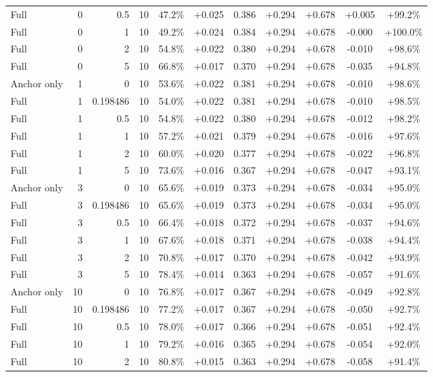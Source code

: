 \begin{table}[htbp]
\begin{tabular}{lrrrccccccc}
Full & 0 & 0.5 & 10 & 47.2\% & +0.025 & 0.386 & +0.294 & +0.678 & +0.005 & +99.2\% \\
Full & 0 & 1 & 10 & 49.2\% & +0.024 & 0.384 & +0.294 & +0.678 & -0.000 & +100.0\% \\
Full & 0 & 2 & 10 & 54.8\% & +0.022 & 0.380 & +0.294 & +0.678 & -0.010 & +98.6\% \\
Full & 0 & 5 & 10 & 66.8\% & +0.017 & 0.370 & +0.294 & +0.678 & -0.035 & +94.8\% \\
Anchor only & 1 & 0 & 10 & 53.6\% & +0.022 & 0.381 & +0.294 & +0.678 & -0.010 & +98.6\% \\
Full & 1 & 0.198486 & 10 & 54.0\% & +0.022 & 0.381 & +0.294 & +0.678 & -0.010 & +98.5\% \\
Full & 1 & 0.5 & 10 & 54.8\% & +0.022 & 0.380 & +0.294 & +0.678 & -0.012 & +98.2\% \\
Full & 1 & 1 & 10 & 57.2\% & +0.021 & 0.379 & +0.294 & +0.678 & -0.016 & +97.6\% \\
Full & 1 & 2 & 10 & 60.0\% & +0.020 & 0.377 & +0.294 & +0.678 & -0.022 & +96.8\% \\
Full & 1 & 5 & 10 & 73.6\% & +0.016 & 0.367 & +0.294 & +0.678 & -0.047 & +93.1\% \\
Anchor only & 3 & 0 & 10 & 65.6\% & +0.019 & 0.373 & +0.294 & +0.678 & -0.034 & +95.0\% \\
Full & 3 & 0.198486 & 10 & 65.6\% & +0.019 & 0.373 & +0.294 & +0.678 & -0.034 & +95.0\% \\
Full & 3 & 0.5 & 10 & 66.4\% & +0.018 & 0.372 & +0.294 & +0.678 & -0.037 & +94.6\% \\
Full & 3 & 1 & 10 & 67.6\% & +0.018 & 0.371 & +0.294 & +0.678 & -0.038 & +94.4\% \\
Full & 3 & 2 & 10 & 70.8\% & +0.017 & 0.370 & +0.294 & +0.678 & -0.042 & +93.9\% \\
Full & 3 & 5 & 10 & 78.4\% & +0.014 & 0.363 & +0.294 & +0.678 & -0.057 & +91.6\% \\
Anchor only & 10 & 0 & 10 & 76.8\% & +0.017 & 0.367 & +0.294 & +0.678 & -0.049 & +92.8\% \\
Full & 10 & 0.198486 & 10 & 77.2\% & +0.017 & 0.367 & +0.294 & +0.678 & -0.050 & +92.7\% \\
Full & 10 & 0.5 & 10 & 78.0\% & +0.017 & 0.366 & +0.294 & +0.678 & -0.051 & +92.4\% \\
Full & 10 & 1 & 10 & 79.2\% & +0.016 & 0.365 & +0.294 & +0.678 & -0.054 & +92.0\% \\
Full & 10 & 2 & 10 & 80.8\% & +0.015 & 0.363 & +0.294 & +0.678 & -0.058 & +91.4\% \\

\end{tabular}
\end{table}
